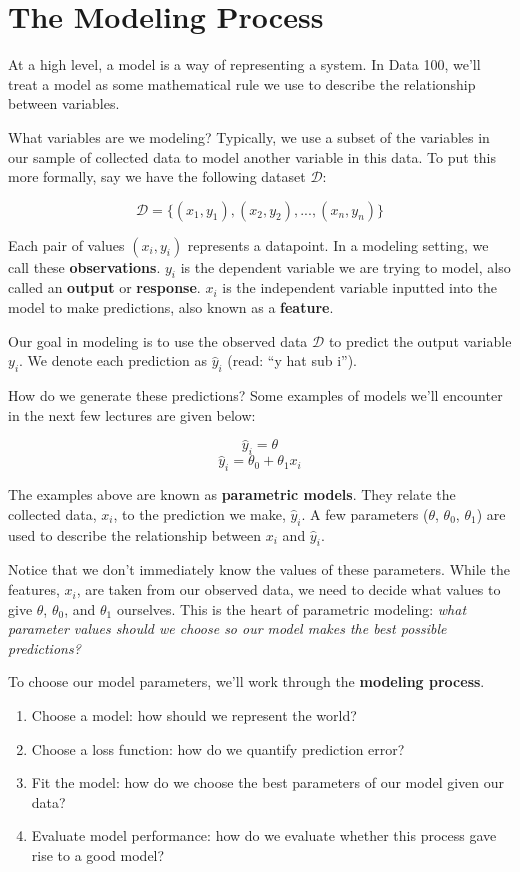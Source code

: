 \documentclass[
  letterpaper,
  DIV=11,
  numbers=noendperiod]{scrreprt}
\providecommand{\tightlist}{%
  \setlength{\itemsep}{0pt}\setlength{\parskip}{0pt}}\usepackage{longtable,booktabs,array}
\begin{document}
\section{The Modeling Process}\label{the-modeling-process}

At a high level, a model is a way of representing a system. In Data 100,
we'll treat a model as some mathematical rule we use to describe the
relationship between variables.

What variables are we modeling? Typically, we use a subset of the
variables in our sample of collected data to model another variable in
this data. To put this more formally, say we have the following dataset
\(\mathcal{D}\):

\[\mathcal{D} = \{(x_1, y_1), (x_2, y_2), ..., (x_n, y_n)\}\]

Each pair of values \((x_i, y_i)\) represents a datapoint. In a modeling
setting, we call these \textbf{observations}. \(y_i\) is the dependent
variable we are trying to model, also called an \textbf{output} or
\textbf{response}. \(x_i\) is the independent variable inputted into the
model to make predictions, also known as a \textbf{feature}.

Our goal in modeling is to use the observed data \(\mathcal{D}\) to
predict the output variable \(y_i\). We denote each prediction as
\(\hat{y}_i\) (read: ``y hat sub i'').

How do we generate these predictions? Some examples of models we'll
encounter in the next few lectures are given below:

\[\hat{y}_i = \theta\] \[\hat{y}_i = \theta_0 + \theta_1 x_i\]

The examples above are known as \textbf{parametric models}. They relate
the collected data, \(x_i\), to the prediction we make, \(\hat{y}_i\). A
few parameters (\(\theta\), \(\theta_0\), \(\theta_1\)) are used to
describe the relationship between \(x_i\) and \(\hat{y}_i\).

Notice that we don't immediately know the values of these parameters.
While the features, \(x_i\), are taken from our observed data, we need
to decide what values to give \(\theta\), \(\theta_0\), and \(\theta_1\)
ourselves. This is the heart of parametric modeling: \emph{what
parameter values should we choose so our model makes the best possible
predictions?}

To choose our model parameters, we'll work through the \textbf{modeling
process}.

\begin{enumerate}
\def\labelenumi{\arabic{enumi}.}
\tightlist
\item
  Choose a model: how should we represent the world?
\item
  Choose a loss function: how do we quantify prediction error?
\item
  Fit the model: how do we choose the best parameters of our model given
  our data?
\item
  Evaluate model performance: how do we evaluate whether this process
  gave rise to a good model?
\end{enumerate}
\end{document}
